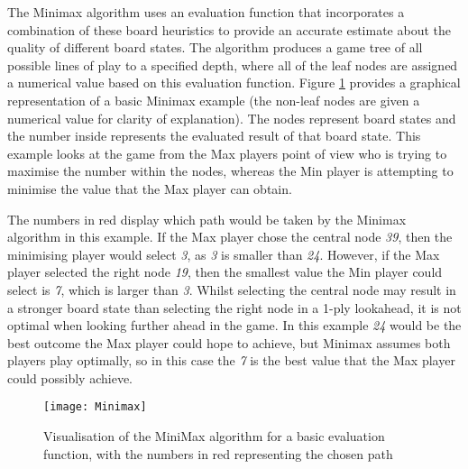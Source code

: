 \documentclass[12pt,a4paper]{article}
\begin{document}
The Minimax algorithm uses an evaluation function that incorporates a combination of these board heuristics to provide an accurate estimate about the quality of different board states. The algorithm produces a game tree of all possible lines of play to a specified depth, where all of the leaf nodes are assigned a numerical value based on this evaluation function. Figure \ref{fig:minimax_diagram} provides a graphical representation of a basic Minimax example (the non-leaf nodes are given a numerical value for clarity of explanation). The nodes represent board states and the number inside represents the evaluated result of that board state. This example looks at the game from the Max players point of view who is trying to maximise the number within the nodes, whereas the Min player is attempting to minimise the value that the Max player can obtain. 

The numbers in red display which path would be taken by the Minimax algorithm in this example. If the Max player chose the central node \textit{39}, then the minimising player would select \textit{3}, as \textit{3} is smaller than \textit{24}. However, if the Max player selected the right node \textit{19}, then the smallest value the Min player could select is \textit{7}, which is larger than \textit{3}. Whilst selecting the central node may result in a stronger board state than selecting the right node in a  1-ply lookahead, it is not optimal when looking further ahead in the game. In this example \textit{24} would be the best outcome the Max player could hope to achieve, but Minimax assumes both players play optimally, so in this case the \textit{7} is the best value that the Max player could possibly achieve.

\begin{figure}[H]
\captionsetup{justification=centering}
\centering
\texttt{[image: Minimax]}
\caption{Visualisation of the MiniMax algorithm for a basic evaluation function, with the numbers in red representing the chosen path}
\label{fig:minimax_diagram}
\end{figure}
\end{document}
